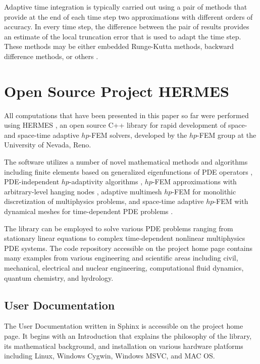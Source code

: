 \documentclass[final,3p,times,twocolumn]{elsarticle}
\begin{document}
Adaptive time integration is typically carried out using a pair of 
methods that provide at the end of each time step two approximations 
with different orders of accuracy. In every time step, the difference between the pair of 
results provides an estimate of the local truncation error that is used to adapt the time 
step. These methods may be either embedded Runge-Kutta
methods, backward difference methods, or others \cite{hairer}. 




\section{Open Source Project HERMES}
\label{sec:hermes}

All computations that have been presented in this paper so far 
were performed using HERMES \cite{hermes}, 
an open source C++ library for rapid development of space- and 
space-time adaptive $hp$-FEM solvers, developed by the $hp$-FEM group 
at the University of Nevada, Reno.  

The software utilizes a number of novel mathematical methods and 
algorithms including finite elements based on generalized eigenfunctions 
of PDE operators \cite{eigen,hermite}, 
PDE-independent $hp$-adaptivity algorithms \cite{pdeindep}, 
$hp$-FEM approximations with arbitrary-level hanging nodes \cite{hangno-1,hangno-2}, 
adaptive multimesh $hp$-FEM  for monolithic discretization of 
multiphysics problems, and
space-time adaptive $hp$-FEM with dynamical meshes for time-dependent PDE problems 
\cite{spacetime-1,spacetime-2}. 

The library can be employed to solve various PDE problems ranging 
from stationary linear equations to complex 
time-dependent nonlinear multiphysics PDE systems. The code repository \cite{hermes-repo}
accessible on the project home page contains many examples from various 
engineering and scientific areas including civil, mechanical, 
electrical and nuclear engineering, computational fluid dynamics, 
quantum chemistry, and hydrology.

\subsection{User Documentation}

The User Documentation %
written in Sphinx
is accessible on the project home page. It begins with an Introduction that explains the 
philosophy of the library, its mathematical background, and installation
on various hardware platforms including Linux, Windows Cygwin, Windows MSVC,
and MAC OS. 
\end{document}
